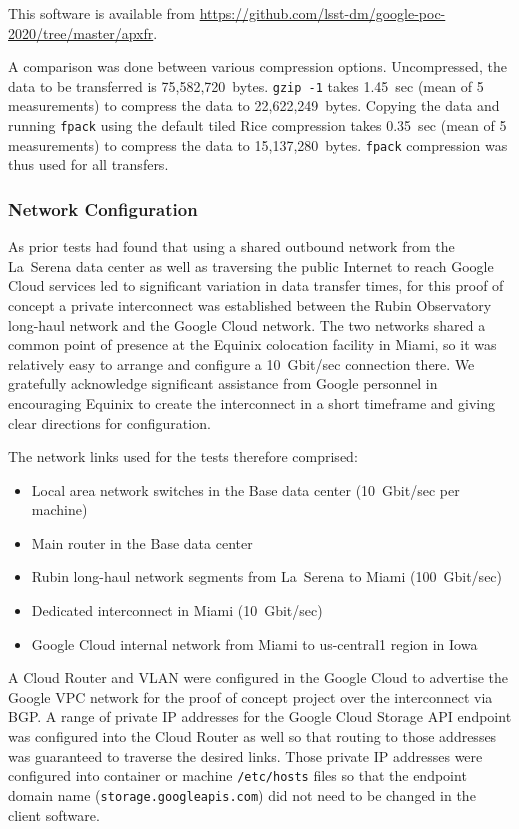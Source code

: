 This software is available from \url{https://github.com/lsst-dm/google-poc-2020/tree/master/apxfr}.

A comparison was done between various compression options.
Uncompressed, the data to be transferred is 75,582,720~bytes.
\texttt{gzip -1} takes 1.45~sec (mean of 5 measurements) to compress the data to 22,622,249~bytes.
Copying the data and running \texttt{fpack} using the default tiled Rice compression takes 0.35~sec (mean of 5 measurements) to compress the data to 15,137,280~bytes.
\texttt{fpack} compression was thus used for all transfers.

\subsubsection{Network Configuration}

As prior tests had found that using a shared outbound network from the La~Serena data center as well as traversing the public Internet to reach Google Cloud services led to significant variation in data transfer times, for this proof of concept a private interconnect was established between the Rubin Observatory long-haul network and the Google Cloud network.
The two networks shared a common point of presence at the Equinix colocation facility in Miami, so it was relatively easy to arrange and configure a 10~Gbit/sec connection there.
We gratefully acknowledge significant assistance from Google personnel in encouraging Equinix to create the interconnect in a short timeframe and giving clear directions for configuration.

The network links used for the tests therefore comprised:
\begin{itemize}
\item Local area network switches in the Base data center (10~Gbit/sec per machine)
\item Main router in the Base data center
\item Rubin long-haul network segments from La~Serena to Miami (100~Gbit/sec)
\item Dedicated interconnect in Miami (10~Gbit/sec)
\item Google Cloud internal network from Miami to us-central1 region in Iowa
\end{itemize}

A Cloud Router and VLAN were configured in the Google Cloud to advertise the Google VPC network for the proof of concept project over the interconnect via BGP.
A range of private IP addresses for the Google Cloud Storage API endpoint was configured into the Cloud Router as well so that routing to those addresses was guaranteed to traverse the desired links.
Those private IP addresses were configured into container or machine \texttt{/etc/hosts} files so that the endpoint domain name (\texttt{storage.googleapis.com}) did not need to be changed in the client software.

